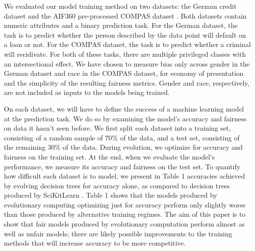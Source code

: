 \documentclass{elsarticle}
\begin{document}
We evaluated our model training method on two datasets: the German credit dataset \citep{Dua:2019} and the AIF360 pre-processed COMPAS dataset \citep{Larson:2016}. Both datasets contain numeric attributes and a binary prediction task. For the German dataset, the task is to predict whether the person described by the data point will default on a loan or not. For the COMPAS dataset, the task is to predict whether a criminal will recidivate. For both of these tasks, there are multiple privileged classes with an intersectional effect. We have chosen to measure bias only across gender in the German dataset and race in the COMPAS dataset, for economy of presentation and the simplicity of the resulting fairness metrics. Gender and race, respectively, are not included as inputs to the models being trained.

On each dataset, we will have to define the success of a machine learning model at the prediction task. We do so by examining the model’s accuracy and fairness on data it hasn’t seen before. We first split each dataset into a training set, consisting of a random sample of 70\% of the data, and a test set, consisting of the remaining 30\% of the data. During evolution, we optimize for accuracy and fairness on the training set. At the end, when we evaluate the model’s performance, we measure its accuracy and fairness on the test set. To quantify how difficult each dataset is to model, we present in Table 1 accuracies achieved by evolving decision trees for accuracy alone, as compared to decision trees produced by SciKitLearn \citep{scikit-learn}. Table 1 shows that the models produced by evolutionary computing optimizing just for accuracy perform only slightly worse than those produced by alternative training regimes. The aim of this paper is to show that fair models produced by evolutionary computation perform almost as well as unfair models; there are likely possible improvements to the training methods that will increase accuracy to be more competitive.
\end{document}
